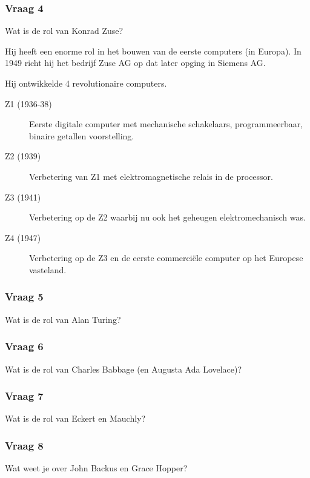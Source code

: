 \documentclass[../main.tex]{subfiles}
\begin{document}
\subsubsection{Vraag 4}
\begin{question}
Wat is de rol van Konrad Zuse?
\end{question}

\begin{solution}
Hij heeft een enorme rol in het bouwen van de eerste computers (in Europa).
In 1949 richt hij het bedrijf Zuse AG op dat later opging in Siemens AG.

Hij ontwikkelde 4 revolutionaire computers.
\begin{description}
		\item[Z1 (1936-38)] Eerste digitale computer met mechanische schakelaars, programmeerbaar, binaire getallen voorstelling.
		\item[Z2 (1939)] Verbetering van Z1 met elektromagnetische relais in de processor.
		\item[Z3 (1941)] Verbetering op de Z2 waarbij nu ook het geheugen elektromechanisch was.
		\item[Z4 (1947)] Verbetering op de Z3 en de eerste commerci\"ele computer op het Europese vasteland.
\end{description}
\end{solution}

\subsubsection{Vraag 5}
\begin{question}
Wat is de rol van Alan Turing?
\end{question}

\subsubsection{Vraag 6}
\begin{question}
Wat is de rol van Charles Babbage (en Augusta Ada Lovelace)?
\end{question}

\subsubsection{Vraag 7}
\begin{question}
Wat is de rol van Eckert en Mauchly?
\end{question}

\subsubsection{Vraag 8}
\begin{question}
Wat weet je over John Backus en Grace Hopper?
\end{question}
\end{document}
